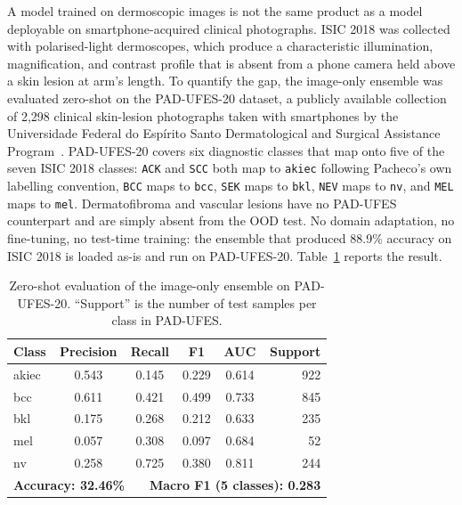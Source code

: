 A model trained on dermoscopic images is not the same product as a model deployable on smartphone-acquired clinical photographs. ISIC 2018 was collected with polarised-light dermoscopes, which produce a characteristic illumination, magnification, and contrast profile that is absent from a phone camera held above a skin lesion at arm's length. To quantify the gap, the image-only ensemble was evaluated zero-shot on the PAD-UFES-20 dataset, a publicly available collection of 2,298 clinical skin-lesion photographs taken with smartphones by the Universidade Federal do Espírito Santo Dermatological and Surgical Assistance Program~\cite{pacheco2020pad}. PAD-UFES-20 covers six diagnostic classes that map onto five of the seven ISIC 2018 classes: \texttt{ACK} and \texttt{SCC} both map to \texttt{akiec} following Pacheco's own labelling convention, \texttt{BCC} maps to \texttt{bcc}, \texttt{SEK} maps to \texttt{bkl}, \texttt{NEV} maps to \texttt{nv}, and \texttt{MEL} maps to \texttt{mel}. Dermatofibroma and vascular lesions have no PAD-UFES counterpart and are simply absent from the OOD test. No domain adaptation, no fine-tuning, no test-time training: the ensemble that produced 88.9\% accuracy on ISIC 2018 is loaded as-is and run on PAD-UFES-20. Table~\ref{tab:ood_pad_ufes} reports the result.

\begin{table}[H]
\centering
\caption{Zero-shot evaluation of the image-only ensemble on PAD-UFES-20. ``Support'' is the number of test samples per class in PAD-UFES.}
\label{tab:ood_pad_ufes}
\begin{tabular}{lccccr}
\toprule
\textbf{Class} & \textbf{Precision} & \textbf{Recall} & \textbf{F1} & \textbf{AUC} & \textbf{Support} \\
\midrule
akiec & 0.543 & 0.145 & 0.229 & 0.614 & 922 \\
bcc   & 0.611 & 0.421 & 0.499 & 0.733 & 845 \\
bkl   & 0.175 & 0.268 & 0.212 & 0.633 & 235 \\
mel   & 0.057 & 0.308 & 0.097 & 0.684 &  52 \\
nv    & 0.258 & 0.725 & 0.380 & 0.811 & 244 \\
\midrule
\multicolumn{6}{l}{\textbf{Accuracy: 32.46\%}~~~~\textbf{Macro F1 (5 classes): 0.283}} \\
\bottomrule
\end{tabular}
\end{table}

